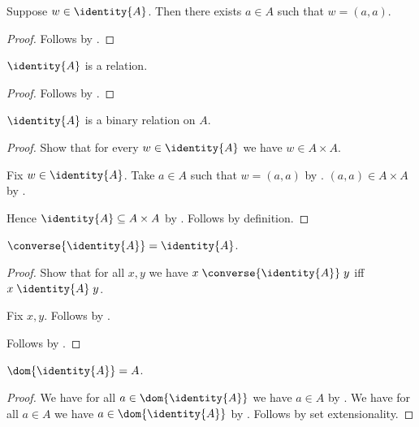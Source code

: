 \begin{proposition}\label{id_elem_inspect}
    Suppose $w\in\identity{A}$.
    Then there exists $a\in A$ such that $w = (a, a)$.
\end{proposition}
\begin{proof}
    Follows by .
\end{proof}

\begin{proposition}\label{id_is_relation}
    $\identity{A}$ is a relation.
\end{proposition}
\begin{proof}
    Follows by .
\end{proof}

\begin{classification}\label{identity_binary_relation_on}
    $\identity{A}$ is a binary relation on $A$.
\end{classification}
\begin{proof}
    Show that for every $w\in\identity{A}$ we have $w\in A\times A$.
    \begin{subproof}
        Fix $w\in\identity{A}$.
        Take $a\in A$ such that $w=(a,a)$ by .
        $(a,a)\in A\times A$ by .
    \end{subproof}
    Hence $\identity{A}\subseteq A\times A$ by .
    Follows by definition.
\end{proof}

\begin{proposition}\label{converse_identity}
    $\converse{\identity{A}}=\identity{A}$.
\end{proposition}
\begin{proof}
    Show that for all $x,y$ we have
        $x\mathrel{\converse{\identity{A}}}y$ iff
        $x\mathrel{\identity{A}}y$.
    \begin{subproof}
        Fix $x,y$.
        Follows by .
    \end{subproof}
    Follows by
        .
\end{proof}

\begin{proposition}\label{id_dom}
    $\dom{\identity{A}} = A$.
\end{proposition}
\begin{proof}
    We have for all $a\in\dom{\identity{A}}$ we have $a\in A$
        by .
    We have for all $a\in A$ we have $a\in\dom{\identity{A}}$
        by .
    Follows by set extensionality.
\end{proof}


